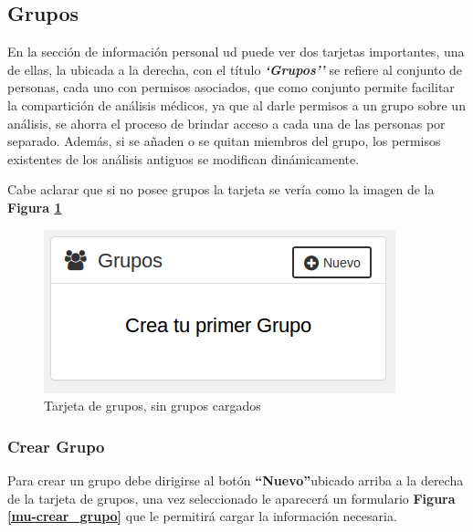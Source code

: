 \documentclass[a4paper,12pt]{article}
\begin{document}
\subsection{Grupos}    
En la sección de información personal ud puede ver dos tarjetas     importantes, una de ellas, la ubicada a la derecha, con el título \textbf{\textit{`Grupos''}} se refiere al conjunto de personas, cada uno con permisos asociados, que como conjunto permite facilitar la compartición de análisis médicos, ya que al darle permisos a un grupo sobre un análisis, se ahorra el proceso de brindar acceso a cada una de las personas por separado. Además, si se añaden o se quitan miembros del grupo, los permisos existentes de los análisis antiguos se modifican dinámicamente.

Cabe aclarar que si no posee  grupos la tarjeta se vería como la imagen de la \textbf{Figura \ref{mu-sin_grupos}}
     \begin{figure}
     	\centering
     	\includegraphics[width=.5\textwidth]{img/manual_de_usuario/sin_grupos}
     	\caption{Tarjeta de grupos, sin grupos cargados}
     	\label{mu-sin_grupos}
     \end{figure}   
\subsubsection{Crear Grupo}
Para crear un grupo debe dirigirse al botón \textbf{``Nuevo''}ubicado arriba a la derecha de la tarjeta de grupos, una vez seleccionado le aparecerá un formulario \textbf{Figura \ref{mu-crear_grupo}} que le permitirá cargar la información necesaria.
\end{document}
